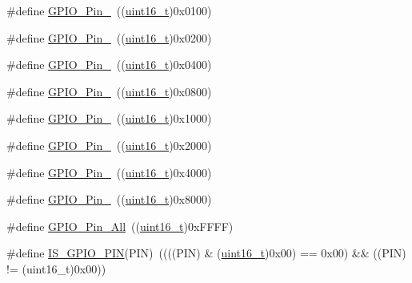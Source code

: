 \begin{DoxyCompactItemize}
\item 
\#define \hyperlink{group___g_p_i_o__pins__define_gac891f0984dc64af3567577fbf13ab304}{G\+P\+I\+O\+\_\+\+Pin\+\_}~((\hyperlink{_p_e___types_8h_a1f1825b69244eb3ad2c7165ddc99c956}{uint16\+\_\+t})0x0100)
\item 
\#define \hyperlink{group___g_p_i_o__pins__define_gaad1891082d5d6bcac06c2729a9fdd2f0}{G\+P\+I\+O\+\_\+\+Pin\+\_}~((\hyperlink{_p_e___types_8h_a1f1825b69244eb3ad2c7165ddc99c956}{uint16\+\_\+t})0x0200)
\item 
\#define \hyperlink{group___g_p_i_o__pins__define_ga726af6407ba60ac60f02057227c2d348}{G\+P\+I\+O\+\_\+\+Pin\+\_}~((\hyperlink{_p_e___types_8h_a1f1825b69244eb3ad2c7165ddc99c956}{uint16\+\_\+t})0x0400)
\item 
\#define \hyperlink{group___g_p_i_o__pins__define_ga5139d5bc3d15784ae7794ed2ae1ff767}{G\+P\+I\+O\+\_\+\+Pin\+\_}~((\hyperlink{_p_e___types_8h_a1f1825b69244eb3ad2c7165ddc99c956}{uint16\+\_\+t})0x0800)
\item 
\#define \hyperlink{group___g_p_i_o__pins__define_gada91257dcaab2c86f75fbd8e4b52b98c}{G\+P\+I\+O\+\_\+\+Pin\+\_}~((\hyperlink{_p_e___types_8h_a1f1825b69244eb3ad2c7165ddc99c956}{uint16\+\_\+t})0x1000)
\item 
\#define \hyperlink{group___g_p_i_o__pins__define_ga4155a41c433f3657b9c79cfbd4240966}{G\+P\+I\+O\+\_\+\+Pin\+\_}~((\hyperlink{_p_e___types_8h_a1f1825b69244eb3ad2c7165ddc99c956}{uint16\+\_\+t})0x2000)
\item 
\#define \hyperlink{group___g_p_i_o__pins__define_ga21cd1d89c0c061a6f09c5a842610bee5}{G\+P\+I\+O\+\_\+\+Pin\+\_}~((\hyperlink{_p_e___types_8h_a1f1825b69244eb3ad2c7165ddc99c956}{uint16\+\_\+t})0x4000)
\item 
\#define \hyperlink{group___g_p_i_o__pins__define_gae686a9fc47cf3e420e5db0784210711d}{G\+P\+I\+O\+\_\+\+Pin\+\_}~((\hyperlink{_p_e___types_8h_a1f1825b69244eb3ad2c7165ddc99c956}{uint16\+\_\+t})0x8000)
\item 
\#define \hyperlink{group___g_p_i_o__pins__define_gaba3e915ddca17a1211edc07b7fd97e8b}{G\+P\+I\+O\+\_\+\+Pin\+\_\+\+All}~((\hyperlink{_p_e___types_8h_a1f1825b69244eb3ad2c7165ddc99c956}{uint16\+\_\+t})0x\+F\+F\+F\+F)
\item 
\#define \hyperlink{group___g_p_i_o__pins__define_gad6ec74e33360395535ad5d91ba6d4781}{I\+S\+\_\+\+G\+P\+I\+O\+\_\+\+P\+IN}(P\+IN)~((((P\+IN) \& (\hyperlink{_p_e___types_8h_a1f1825b69244eb3ad2c7165ddc99c956}{uint16\+\_\+t})0x00) == 0x00) \&\& ((\+P\+I\+N) != (uint16\+\_\+t)0x00))
\item 

\end{DoxyCompactItemize}
